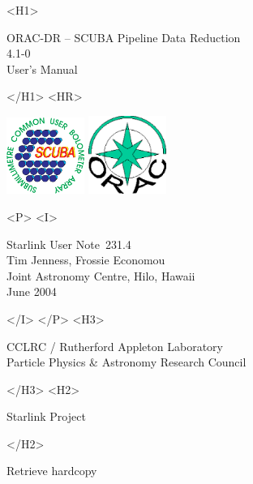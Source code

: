 \documentclass[twoside,11pt]{article}
\newcommand{\stardoccategory}  {Starlink User Note}
\newcommand{\stardocsource}    {sun\stardocnumber}
\newcommand{\stardocnumber}    {231.4}
\newcommand{\stardocauthors}   {Tim Jenness, Frossie Economou\\
Joint Astronomy Centre, Hilo, Hawaii}
\newcommand{\stardocdate}      {June 2004}
\newcommand{\stardoctitle}     {ORAC-DR -- SCUBA Pipeline Data Reduction}
\newcommand{\stardocversion}   {4.1-0}
\newcommand{\stardocmanual}    {User's Manual}
\newcommand{\htmladdnormallink}[2]{#1}
\newcommand{\htmladdimg}[1]{}
\newcommand{\xlabel}[1]{}
\renewcommand{\_}{\texttt{\symbol{95}}}
\begin{document}
\begin{htmlonly}
   \xlabel{}
   \begin{rawhtml} <H1> \end{rawhtml}
      \stardoctitle\\
      \stardocversion\\
      \stardocmanual
   \begin{rawhtml} </H1> <HR> \end{rawhtml}

\includegraphics[width=1.0in]{sun231_sculogo.eps}
\includegraphics[width=1.0in]{sun231_logo.eps}

   \begin{rawhtml} <P> <I> \end{rawhtml}
   \stardoccategory\ \stardocnumber \\
   \stardocauthors \\
   \stardocdate
   \begin{rawhtml} </I> </P> <H3> \end{rawhtml}
      \htmladdnormallink{CCLRC / Rutherford Appleton Laboratory}
                        {http://www.cclrc.ac.uk} \\
      \htmladdnormallink{Particle Physics \& Astronomy Research Council}
                        {http://www.pparc.ac.uk} \\
   \begin{rawhtml} </H3> <H2> \end{rawhtml}
      \htmladdnormallink{Starlink Project}{http://www.starlink.rl.ac.uk/}
   \begin{rawhtml} </H2> \end{rawhtml}
   \htmladdnormallink{\htmladdimg{source.gif} Retrieve hardcopy}
      {http://www.starlink.rl.ac.uk/cgi-bin/hcserver?\stardocsource}\\


\end{htmlonly}
\end{document}
